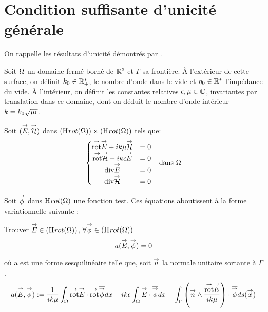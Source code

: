 \section{Condition suffisante d'unicité générale}

  On rappelle les résultats d’unicité démontrés par \cite[chapitre 2, section 11]{cessenat_mathematical_1996}.

  Soit \(\OO\) un domaine fermé borné de \(\RR^3\) et \(\Gamma\) sa frontière.
  À l'extérieur de cette surface, on définit \(k_0 \in \RR_+^*\), le nombre d'onde dans le vide et \(\eta_0 \in \RR^*\) l'impédance du vide.
  À l'intérieur, on définit les constantes relatives \(\eps,\mu \in \CC\), invariantes par translation dans ce domaine, dont on déduit le nombre d'onde intérieur \(k = k_0 \sqrt{\mu\eps}\).

  Soit \((\vE,\vH)\) dans \((\Hrot(\OO)) \times (\Hrot(\OO))\) tels que:
  \begin{align}
  \left\lbrace
    \begin{matrix}
      \trot \vE + ik \mu \vH &= 0
      \\
      \trot \vH - ik \eps \vE &= 0
      \\
      \tdiv \vE &= 0
      \\
      \tdiv \vH &= 0
    \end{matrix}
    \right. && \text{dans \(\OO\)}
  \end{align}

  Soit \(\vect{\phi}\) dans \(\Hrot(\OO)\) une fonction test. Ces équations aboutissent à la forme variationnelle suivante :
  \begin{prop}
    Trouver \(\vE \in \left(\Hrot(\OO)\right)\), \(\forall \vect \phi \in \left(\Hrot(\OO)\right)\)
    \[
      a(\vE,\vect\phi) = 0
    \]
  \end{prop}

  où a est une forme sesquilinéaire telle que, soit \(\vn\) la normale unitaire sortante à \(\Gamma\).
  \begin{align*}
    a(\vE,\vect\phi) &:=  \frac{1}{ik\mu} \int_\OO \trot \vE \cdot \trot \conj{\vect{\phi}} dx + ik\eps\int_\OO\vE\cdot\conj{\vect{\phi}} dx
      - \int_\Gamma \left(\vn \pvect \frac{\trot \vE}{ik\mu}\right) \cdot \conj{\vect \phi} ds(\vx) \\
   \end{align*}

